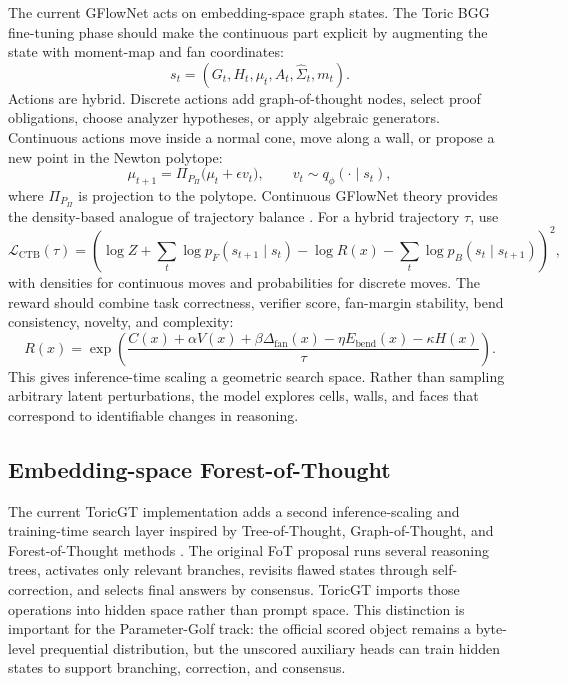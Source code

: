 \documentclass[11pt]{article}
\theoremstyle{definition}
\theoremstyle{plain}
\theoremstyle{remark}
\numberwithin{equation}{section}
\begin{document}
The current GFlowNet acts on embedding-space graph states.  The Toric BGG fine-tuning phase should make the continuous part explicit by augmenting the state with moment-map and fan coordinates:
\begin{equation}
  s_t=(G_t,H_t,\mu_t,A_t,\widehat\Sigma_t,m_t).
\end{equation}
Actions are hybrid.  Discrete actions add graph-of-thought nodes, select proof obligations, choose analyzer hypotheses, or apply algebraic generators.  Continuous actions move inside a normal cone, move along a wall, or propose a new point in the Newton polytope:
\begin{equation}
  \mu_{t+1}=\Pi_{P_\Pi}\bigl(\mu_t+\epsilon v_t\bigr),
  \qquad v_t\sim q_\phi(\cdot\mid s_t),
\end{equation}
where $\Pi_{P_\Pi}$ is projection to the polytope.  Continuous GFlowNet theory provides the density-based analogue of trajectory balance \cite{lahlou2023continuous}.  For a hybrid trajectory $\tau$, use
\begin{equation}
  \mathcal L_{\mathrm{CTB}}(\tau)=
  \left(
    \log Z+\sum_t\log p_F(s_{t+1}\mid s_t)
    -\log R(x)
    -\sum_t\log p_B(s_t\mid s_{t+1})
  \right)^2,
\end{equation}
with densities for continuous moves and probabilities for discrete moves.  The reward should combine task correctness, verifier score, fan-margin stability, bend consistency, novelty, and complexity:
\begin{equation}
  R(x)=\exp\left(
    \frac{
      C(x)+\alpha V(x)+\beta\Delta_{\mathrm{fan}}(x)
      -\eta E_{\mathrm{bend}}(x)-\kappa H(x)
    }{\tau}
  \right).
\end{equation}
This gives inference-time scaling a geometric search space.  Rather than sampling arbitrary latent perturbations, the model explores cells, walls, and faces that correspond to identifiable changes in reasoning.

\subsection{Embedding-space Forest-of-Thought}

The current ToricGT implementation adds a second inference-scaling and training-time search layer inspired by Tree-of-Thought, Graph-of-Thought, and Forest-of-Thought methods \cite{yao2023tree,besta2023graph,bi2024forest}.  The original FoT proposal runs several reasoning trees, activates only relevant branches, revisits flawed states through self-correction, and selects final answers by consensus.  ToricGT imports those operations into hidden space rather than prompt space.  This distinction is important for the Parameter-Golf track: the official scored object remains a byte-level prequential distribution, but the unscored auxiliary heads can train hidden states to support branching, correction, and consensus.
\end{document}
